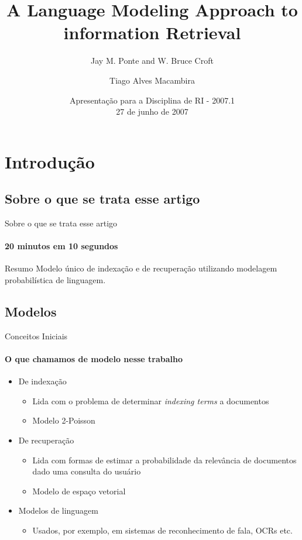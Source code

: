 \documentclass[compress]{beamer}
\title[Language Modeling Approach]{A Language Modeling Approach to
information Retrieval}
\subtitle{Jay M. Ponte and W. Bruce Croft}
\author[Tiago Macambira]{Tiago Alves Macambira }
\institute{e-Speed \\ Departamento de Ciência da Computação \\ Universidade Federal de Minas Gerais}
\date{
Apresentação para a Disciplina de RI - 2007.1 \\
27 de junho de 2007}
\begin{document}
\frame{ \titlepage }



\section{Introdução}
\subsection{Sobre o que se trata esse artigo}

    \begin{frame}{Sobre o que se trata esse artigo}
    \framesubtitle{20 minutos em 10 segundos}
	\begin{block}{Resumo}
            Modelo único de indexação e de recuperação utilizando modelagem probabilística
            de linguagem.
	\end{block}
    \end{frame}

\subsection{Modelos}

    \begin{frame}{Conceitos Iniciais}
    \framesubtitle{O que chamamos de modelo nesse trabalho}
            \begin{itemize}
                \item De indexação
                \begin{itemize}
                    \item Lida com o problema de determinar \emph{indexing terms} a documentos
                    \item Modelo 2-Poisson
                \end{itemize}

                \item De recuperação
                \begin{itemize}
                    \item Lida com formas de estimar a probabilidade da relevância de documentos
                    dado uma consulta do usuário
                    \item Modelo de espaço vetorial
                \end{itemize}

                \item Modelos de linguagem
                \begin{itemize}
                    \item Usados, por exemplo, em sistemas de reconhecimento de fala, OCRs etc.
                \end{itemize}
            \end{itemize}
    \end{frame}
\end{document}
